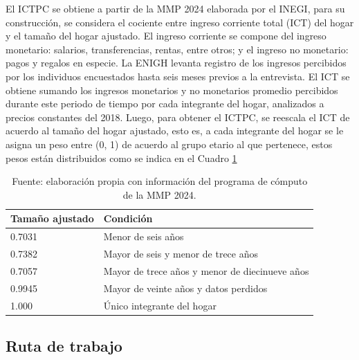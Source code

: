 \documentclass[11pt]{article}
\begin{document}
El ICTPC se obtiene a partir de la MMP 2024 elaborada por el INEGI, para su construcción, se considera el cociente entre ingreso corriente total (ICT) del hogar y el tamaño del hogar ajustado. El ingreso corriente se compone del ingreso monetario: salarios, transferencias, rentas, entre otros; y el ingreso no monetario: pagos y regalos en especie. La ENIGH levanta registro de los ingresos percibidos por los individuos encuestados hasta seis meses previos a la entrevista.  El ICT se obtiene sumando los ingresos monetarios y no monetarios promedio percibidos durante este periodo de tiempo por cada integrante del hogar, analizados a precios constantes del 2018. 
Luego, para obtener el ICTPC, se reescala el ICT de acuerdo al tamaño del hogar ajustado, esto es, a cada integrante del hogar se le asigna un peso entre (0, 1) de acuerdo al grupo etario al que pertenece, estos pesos están distribuidos como se indica en el Cuadro \ref{tab:tamaño_ajustado}
\begin{table}[H]
\centering
\caption[]{Fuente: elaboración propia con información del programa de cómputo de la MMP 2024.}
\label{tab:tamaño_ajustado}
\begin{tabular}{ll}
\hline
Tamaño ajustado & Condición \\
\hline
0.7031 & Menor de seis años \\
0.7382 & Mayor de seis y menor de trece años \\
0.7057 & Mayor de trece años y menor de diecinueve años \\
0.9945 & Mayor de veinte años y datos perdidos \\
1.000 & Único integrante del hogar \\ 
\hline
\end{tabular}
\end{table}


\subsection{Ruta de trabajo}
\end{document}
